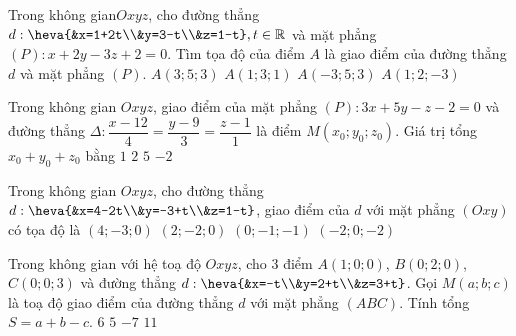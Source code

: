 \begin{ex}%
Trong không gian$ Oxyz$, cho đường thẳng $d:\heva{&x=1+2t\\&y=3-t\\&z=1-t}, t\in\mathbb{R}$ và mặt phẳng $(P):x+2y-3z+2=0$. Tìm tọa độ của điểm $A$ là giao điểm của đường thẳng $d$ và mặt phẳng $(P)$.
\choice
{$A(3;5;3)$}
{$A(1;3;1)$}
{\True $A(-3;5;3)$}
{$A(1;2;-3)$}
\end{ex}

\begin{ex}%
Trong không gian $Oxyz$, giao điểm của mặt phẳng $(P):3x+5y-z-2=0$ và đường thẳng $\Delta:\dfrac{x-12}{4}=\dfrac{y-9}{3}=\dfrac{z-1}{1}$ là điểm $M\left(x_0;y_0;z_0\right)$. Giá trị tổng $x_0+y_0+z_0$ bằng
\choice
{$1$}
{$2$}
{$5$}
{\True $-2$}
\end{ex}

\begin{ex}%
Trong không gian $Oxyz$, cho đường thẳng $d:\heva{&x=4-2t\\&y=-3+t\\&z=1-t}$, giao điểm của $d$ với mặt phẳng $(Oxy)$ có tọa độ là
\choice
{$(4;-3;0)$}
{\True $(2;-2;0)$}
{$(0;-1;-1)$}
{$(-2;0;-2)$}
\end{ex}

\begin{ex}%
Trong không gian với hệ toạ độ $Oxyz$, cho $3$ điểm $A(1;0;0)$, $B(0;2;0)$, $C(0;0;3)$ và đường thẳng $d:\heva{&x=-t\\&y=2+t\\&z=3+t}$. Gọi $M(a;b;c)$ là toạ độ giao điểm của đường thẳng $d$ với mặt phẳng $(ABC)$. Tính tổng $S=a+b-c$.
\choice
{$6$}
{$5$}
{\True $-7$}
{$11$}
\end{ex}

